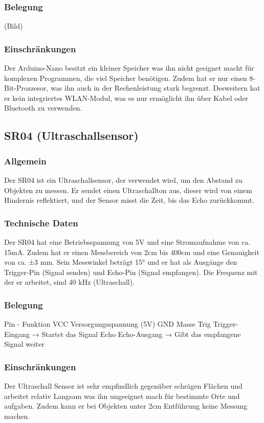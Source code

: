 \subsubsection{Belegung}
(Bild)
\subsubsection{Einschränkungen}
Der Arduino-Nano besitzt ein kleiner Speicher was ihn  nicht geeignet macht für komplexen Programmen, die viel Speicher benötigen. 
Zudem hat er nur einen 8-Bit-Prozzesor, was ihn auch in der Rechenleistung stark begrenzt. Desweitern hat er kein integriertes WLAN-Modul, 
was es nur ermöglicht ihn  über Kabel oder Bluetooth zu verwenden.
%
\subsection{SR04 (Ultraschallsensor)}
%
\subsubsection{Allgemein}
Der SR04 ist ein Ultraschallsensor, der verwendet wird, um den Abstand zu Objekten zu messen. 
Er sendet einen Ultraschallton aus, dieser wird von einem Hindernis reflektiert, und der Sensor misst die Zeit, bis das Echo zurückkommt.
\subsubsection{Technische Daten}
Der SR04 hat eine Betriebsspannung von 5V und eine Stromaufnahme von ca. 15mA. 
Zudem hat er einen Messbereich von 2cm bis 400cm und eine Genauigkeit von ca. ±3 mm. 
Sein Messwinkel beträgt 15° und er hat als Ausgänge den Trigger-Pin (Signal senden) und Echo-Pin (Signal empfangen). 
Die Frequenz mit der er arbeitet, sind 40 kHz (Ultraschall).
\subsubsection{Belegung}
Pin  -   	Funktion
VCC	Versorgungsspannung (5V)
GND	Masse
Trig	Trigger-Eingang → Startet das Signal
Echo	Echo-Ausgang → Gibt das empfangene Signal weiter
\subsubsection{Einschränkungen}
Der Ultraschall Sensor ist sehr empfindlich gegenüber schrägen Flächen und arbeitet relativ Langsam was ihn ungeeignet mach für bestimmte Orte und aufgaben. 
Zudem kann er bei Objekten unter 2cm Entführung keine Messung machen.
%

